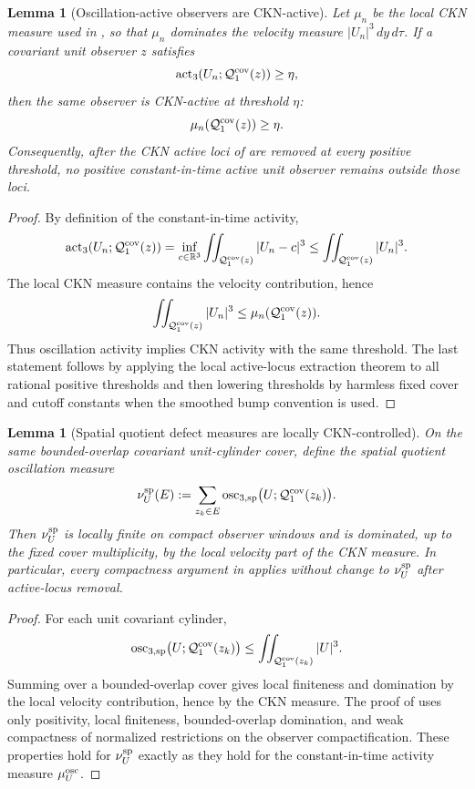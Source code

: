 \documentclass[11pt]{amsart}
\numberwithin{equation}{section}
\theoremstyle{plain}
\newtheorem{lemma}[theorem]{Lemma}
\theoremstyle{definition}
\theoremstyle{remark}
\newcommand{\oscsp}{\operatorname{osc}_{3,\mathrm{sp}}}
\newcommand{\actthree}{\operatorname{act}_3}
\begin{document}
\begin{lemma}[Oscillation-active observers are CKN-active]
\label{lem:oscillation-active-implies-ckn-active}
Let \(\mu_n\) be the local CKN measure used in
, so that \(\mu_n\) dominates the velocity
measure \(|U_n|^3\,dy\,d\tau\).  If a covariant unit observer \(z\) satisfies
\[
   \actthree(U_n;\mathcal Q_1^{\rm cov}(z))\ge\eta ,
\]
then the same observer is CKN-active at threshold \(\eta\):
\[
   \mu_n(\mathcal Q_1^{\rm cov}(z))\ge\eta .
\]
Consequently, after the CKN active loci of
 are removed at every positive threshold, no
positive constant-in-time active unit observer remains outside those loci.
\end{lemma}

\begin{proof}
By definition of the constant-in-time activity,
\[
   \actthree(U_n;\mathcal Q_1^{\rm cov}(z))
   =
   \inf_{c\in\mathbb R^3}
      \iint_{\mathcal Q_1^{\rm cov}(z)}|U_n-c|^3
   \le
   \iint_{\mathcal Q_1^{\rm cov}(z)}|U_n|^3 .
\]
The local CKN measure contains the velocity contribution, hence
\[
   \iint_{\mathcal Q_1^{\rm cov}(z)}|U_n|^3
   \le
   \mu_n(\mathcal Q_1^{\rm cov}(z)).
\]
Thus oscillation activity implies CKN activity with the same threshold.  The
last statement follows by applying the local active-locus extraction theorem to
all rational positive thresholds and then lowering thresholds by harmless fixed
cover and cutoff constants when the smoothed bump convention is used.
\end{proof}

\begin{lemma}[Spatial quotient defect measures are locally CKN-controlled]
\label{lem:spatial-quotient-defect-cKN-control}
On the same bounded-overlap covariant unit-cylinder cover, define the spatial
quotient oscillation measure
\[
   \nu_U^{\rm sp}(E)
   :=
   \sum_{z_k\in E}
      \oscsp\bigl(U;\mathcal Q_1^{\rm cov}(z_k)\bigr).
\]
Then \(\nu_U^{\rm sp}\) is locally finite on compact observer windows and is
dominated, up to the fixed cover multiplicity, by the local velocity part of
the CKN measure.  In particular, every compactness argument in
 applies without change to
\(\nu_U^{\rm sp}\) after active-locus removal.
\end{lemma}

\begin{proof}
For each unit covariant cylinder,
\[
   \oscsp\bigl(U;\mathcal Q_1^{\rm cov}(z_k)\bigr)
   \le
   \iint_{\mathcal Q_1^{\rm cov}(z_k)}|U|^3 .
\]
Summing over a bounded-overlap cover gives local finiteness and domination by
the local velocity contribution, hence by the CKN measure.  The proof of
 uses only positivity, local finiteness,
bounded-overlap domination, and weak compactness of normalized restrictions on
the observer compactification.  These properties hold for
\(\nu_U^{\rm sp}\) exactly as they hold for the constant-in-time activity
measure \(\mu_U^{\rm osc}\).
\end{proof}
\end{document}
